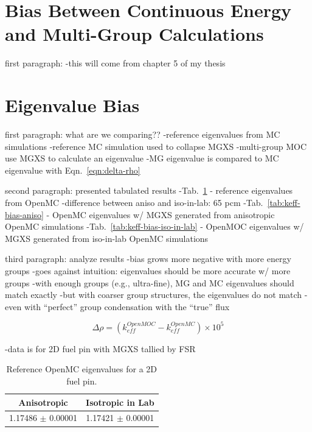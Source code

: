 \section{Bias Between Continuous Energy and Multi-Group Calculations}
\label{sec:bias}

first paragraph:
-this will come from chapter 5 of my thesis


\section{Eigenvalue Bias}
\label{sec:bias-eigenvalues}

first paragraph: what are we comparing??
-reference eigenvalues from MC simulations
-reference MC simulation used to collapse MGXS
-multi-group MOC use MGXS to calculate an eigenvalue
-MG eigenvalue is compared to MC eigenvalue with Eqn.~\ref{eqn:delta-rho}

second paragraph: presented tabulated results
-Tab.~\ref{tab:keff-reference} - reference eigenvalues from OpenMC
  -difference between aniso and iso-in-lab: 65 pcm
-Tab.~\ref{tab:keff-bias-aniso} - OpenMC eigenvalues w/ MGXS generated from anisotropic OpenMC simulations
-Tab.~\ref{tab:keff-bias-iso-in-lab} - OpenMOC eigenvalues w/ MGXS generated from iso-in-lab OpenMC simulations

third paragraph: analyze results
-bias grows more negative with more energy groups
  -goes against intuition: eigenvalues should be more accurate w/ more groups
  -with enough groups (e.g., ultra-fine), MG and MC eigenvalues should match exactly
  -but with coarser group structures, the eigenvalues do not match
    -even with ``perfect'' group condensation with the ``true'' flux

\begin{equation}
\label{eqn:delta-rho}
\Delta\rho = \left(k_{eff}^{OpenMOC} - k_{eff}^{OpenMC}\right) \times 10^{5}
\end{equation}

-data is for 2D fuel pin with MGXS tallied by FSR

\begin{table}[h!]
  \centering
  \caption{Reference OpenMC eigenvalues for a 2D fuel pin.}
  \label{tab:keff-reference} 
  \begin{tabular}{c c}
  \toprule
  {\bf Anisotropic} &
  {\bf Isotropic in Lab} \\
  \midrule
  1.17486 $\pm$ 0.00001 & 1.17421 $\pm$ 0.00001 \\
  \bottomrule
\end{tabular}
\end{table}

